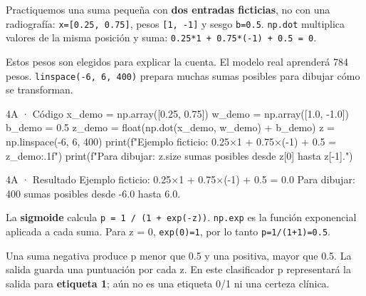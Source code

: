 \label{paso-4a}

Practiquemos una suma pequeña con \textbf{dos entradas ficticias}, no con una radiografía: \texttt{\small x=\allowbreak{}[\allowbreak{}0.\allowbreak{}25,\allowbreak{} 0.\allowbreak{}75]\allowbreak{}}, pesos \texttt{\small [\allowbreak{}1,\allowbreak{} -1]\allowbreak{}} y sesgo \texttt{\small b=\allowbreak{}0.\allowbreak{}5}. \texttt{\small np.\allowbreak{}dot} multiplica valores de la misma posición y suma: \texttt{\small 0.\allowbreak{}25*1 + 0.\allowbreak{}75*(\allowbreak{}-1)\allowbreak{} + 0.\allowbreak{}5 =\allowbreak{} 0}.

Estos pesos son elegidos para explicar la cuenta. El modelo real aprenderá 784 pesos. \texttt{\small linspace(\allowbreak{}-6,\allowbreak{} 6,\allowbreak{} 400)\allowbreak{}} prepara muchas sumas posibles para dibujar cómo se transforman.


\begin{Codigo}{4A · Código}
x_demo = np.array([0.25, 0.75])
w_demo = np.array([1.0, -1.0])
b_demo = 0.5
z_demo = float(np.dot(x_demo, w_demo) + b_demo)
z = np.linspace(-6, 6, 400)
print(f"Ejemplo ficticio: 0.25×1 + 0.75×(-1) + 0.5 = {z_demo:.1f}")
print(f"Para dibujar: {z.size} sumas posibles desde {z[0]} hasta {z[-1]}.")
\end{Codigo}

\begin{Salida}{4A · Resultado}
Ejemplo ficticio: 0.25×1 + 0.75×(-1) + 0.5 = 0.0
Para dibujar: 400 sumas posibles desde -6.0 hasta 6.0.
\end{Salida}

\label{paso-4b}

La \textbf{sigmoide} calcula \texttt{\small p =\allowbreak{} 1 /\allowbreak{} (\allowbreak{}1 + exp(\allowbreak{}-z)\allowbreak{})\allowbreak{}}. \texttt{\small np.\allowbreak{}exp} es la función exponencial aplicada a cada suma. Para z = 0, \texttt{\small exp(\allowbreak{}0)\allowbreak{}=\allowbreak{}1}, por lo tanto \texttt{\small p=\allowbreak{}1/\allowbreak{}(\allowbreak{}1+1)\allowbreak{}=\allowbreak{}0.\allowbreak{}5}.

Una suma negativa produce p menor que 0.5 y una positiva, mayor que 0.5. La salida guarda una puntuación por cada z. En este clasificador p representará la salida para \textbf{etiqueta 1}; aún no es una etiqueta 0/1 ni una certeza clínica.


